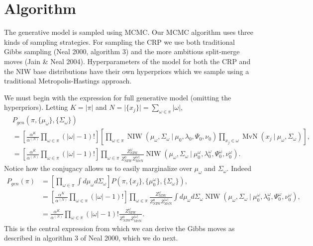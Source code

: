 \documentclass[11pt, oneside]{article}   	%
\DeclareMathOperator{\NIW}{NIW}
\DeclareMathOperator{\MvN}{MvN}
\begin{document}
\section{Algorithm}
The generative model is sampled using MCMC. Our MCMC algorithm uses three kinds of sampling strategies. For sampling the CRP we use both traditional Gibbs sampling (Neal 2000, algorithm 3) and the more ambitious split-merge moves (Jain \& Neal 2004). Hyperparameters of the model for both the CRP and the NIW base distributions have their own hyperpriors which we sample using a traditional Metropolis-Hastings approach.

We must begin with the expression for full generative model (omitting the hyperpriors). Letting $K = \vert\pi\vert$ and $N = \vert\lbrace x_j\rbrace\vert = \sum_{\omega\in\pi}\vert\omega\vert$,
\begin{equation}\begin{split}
&P_{gen}(\pi, \lbrace\mu_\omega\rbrace, \lbrace\Sigma_\omega\rbrace)\\
&= \left[\frac{\alpha^K}{\alpha^{(N)}}\prod_{\omega\in\pi}(\vert\omega\vert - 1)!\right]\left[\prod_{\omega\in\pi}\NIW(\mu_\omega,\Sigma_\omega~\vert~\mu_0,\lambda_0,\Psi_0,\nu_0)\prod_{x_j\in\omega} \operatorname{MvN}(x_j~\vert~\mu_\omega,\Sigma_\omega)\right],\\
&= \left[\frac{\alpha^K}{\alpha^{(N)}}\prod_{\omega\in\pi}(\vert\omega\vert - 1)!\right]\prod_{\omega\in\pi}\frac{Z^\omega_{\NIW}}{Z_{\NIW}^0 Z_{\MvN}^{\vert\omega\vert}}\NIW(\mu_\omega,\Sigma_\omega~\vert~\mu_0^\omega, \lambda_0^\omega, \Psi_0^\omega, \nu_0^\omega).
\end{split}\end{equation}
Notice how the conjugacy allows us to easily marginalize over $\mu_\omega$ and $\Sigma_\omega$. Indeed
\begin{equation}\begin{split}
P_{gen}(\pi) &= \left[\prod_{\omega\in\pi}\int d\mu_\omega d\Sigma_\omega\right]P(\pi, \lbrace x_j\rbrace, \lbrace\mu_0^\omega\rbrace, \lbrace\Sigma_\omega\rbrace),\\
&= \left[\frac{\alpha^K}{\alpha^{(N)}}\prod_{\omega\in\pi}(\vert\omega\vert - 1)!\right]\prod_{\omega\in\pi}\frac{Z^\omega_{\NIW}}{Z_{\NIW}^0 Z_{\MvN}^{\vert\omega\vert}}\int d\mu_\omega d\Sigma_\omega \NIW(\mu_\omega,\Sigma_\omega~\vert~\mu_0^\omega, \lambda_0^\omega, \Psi_0^\omega, \nu_0^\omega),\\
&= \frac{\alpha^K}{\alpha^{(N)}}\prod_{\omega\in\pi}(\vert\omega\vert - 1)! \frac{Z^\omega_{\NIW}}{Z_{NIW}^0 Z_{\MvN}^{\vert\omega\vert}}.
\end{split}\end{equation}
This is the central expression from which we can derive the Gibbs moves as described in algorithm 3 of Neal 2000, which we do next.
\end{document}
